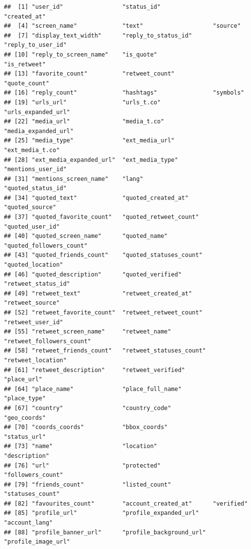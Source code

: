 \documentclass[
]{book}
\begin{document}
\begin{verbatim}
##  [1] "user_id"                 "status_id"               "created_at"             
##  [4] "screen_name"             "text"                    "source"                 
##  [7] "display_text_width"      "reply_to_status_id"      "reply_to_user_id"       
## [10] "reply_to_screen_name"    "is_quote"                "is_retweet"             
## [13] "favorite_count"          "retweet_count"           "quote_count"            
## [16] "reply_count"             "hashtags"                "symbols"                
## [19] "urls_url"                "urls_t.co"               "urls_expanded_url"      
## [22] "media_url"               "media_t.co"              "media_expanded_url"     
## [25] "media_type"              "ext_media_url"           "ext_media_t.co"         
## [28] "ext_media_expanded_url"  "ext_media_type"          "mentions_user_id"       
## [31] "mentions_screen_name"    "lang"                    "quoted_status_id"       
## [34] "quoted_text"             "quoted_created_at"       "quoted_source"          
## [37] "quoted_favorite_count"   "quoted_retweet_count"    "quoted_user_id"         
## [40] "quoted_screen_name"      "quoted_name"             "quoted_followers_count" 
## [43] "quoted_friends_count"    "quoted_statuses_count"   "quoted_location"        
## [46] "quoted_description"      "quoted_verified"         "retweet_status_id"      
## [49] "retweet_text"            "retweet_created_at"      "retweet_source"         
## [52] "retweet_favorite_count"  "retweet_retweet_count"   "retweet_user_id"        
## [55] "retweet_screen_name"     "retweet_name"            "retweet_followers_count"
## [58] "retweet_friends_count"   "retweet_statuses_count"  "retweet_location"       
## [61] "retweet_description"     "retweet_verified"        "place_url"              
## [64] "place_name"              "place_full_name"         "place_type"             
## [67] "country"                 "country_code"            "geo_coords"             
## [70] "coords_coords"           "bbox_coords"             "status_url"             
## [73] "name"                    "location"                "description"            
## [76] "url"                     "protected"               "followers_count"        
## [79] "friends_count"           "listed_count"            "statuses_count"         
## [82] "favourites_count"        "account_created_at"      "verified"               
## [85] "profile_url"             "profile_expanded_url"    "account_lang"           
## [88] "profile_banner_url"      "profile_background_url"  "profile_image_url"
\end{verbatim}
\end{document}
